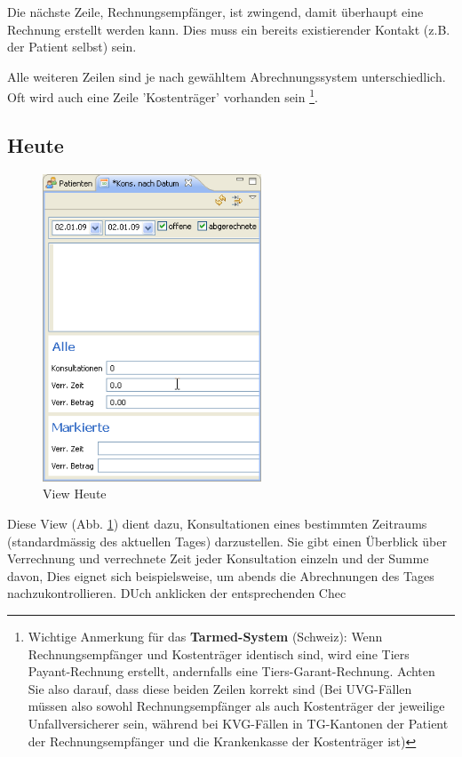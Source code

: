 Die nächste Zeile, Rechnungsempfänger, ist zwingend, damit überhaupt eine Rechnung erstellt werden kann. Dies muss ein bereits existierender Kontakt (z.B. der Patient selbst) sein.

\medskip
Alle weiteren Zeilen sind je nach gewähltem Abrechnungssystem unterschiedlich. Oft wird auch eine Zeile 'Kostenträger' vorhanden sein \footnote{Wichtige Anmerkung für das \textbf{Tarmed-System} (Schweiz): Wenn Rechnungsempfänger und Kostenträger identisch sind, wird eine Tiers Payant-Rechnung erstellt, andernfalls eine Tiers-Garant-Rechnung. Achten Sie also darauf, dass diese beiden Zeilen korrekt sind (Bei UVG-Fällen müssen also sowohl Rechnungsempfänger als auch Kostenträger der jeweilige Unfallversicherer sein, während bei KVG-Fällen in TG-Kantonen der Patient der Rechnungsempfänger und die Krankenkasse der Kostenträger ist)}.

\clearpage

\subsection{Heute}
\begin{figure}
\includegraphics[width=6.5cm]{images/heute}
\caption{View Heute}\label{fig:heute}
\end{figure}
Diese View (Abb. \ref{fig:heute}) dient dazu, Konsultationen eines bestimmten Zeitraums (standardmässig
des aktuellen Tages) darzustellen. Sie gibt einen Überblick über Verrechnung und
verrechnete Zeit jeder Konsultation einzeln und der Summe davon, Dies eignet
sich beispielsweise, um abends die Abrechnungen des Tages nachzukontrollieren. DUch anklicken der entsprechenden Chec


